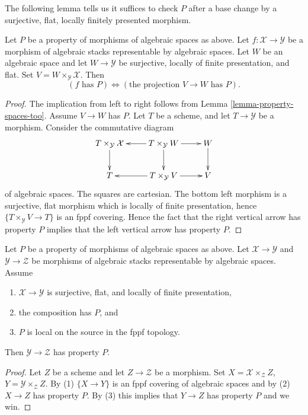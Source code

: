 \noindent
The following lemma tells us it suffices to check $P$
after a base change by a surjective, flat, locally finitely presented
morphism.

\begin{lemma}
\label{lemma-check-property-covering}
Let $P$ be a property of morphisms of algebraic spaces as above.
Let $f : \mathcal{X} \to \mathcal{Y}$ be a morphism of algebraic stacks
representable by algebraic spaces.
Let $W$ be an algebraic space and let $W \to \mathcal{Y}$ be surjective,
locally of finite presentation, and flat.
Set $V = W \times_{\mathcal{Y}} \mathcal{X}$. Then
$$
(f\text{ has }P) \Leftrightarrow (\text{the projection }V \to W\text{ has }P).
$$
\end{lemma}

\begin{proof}
The implication from left to right follows from
Lemma \ref{lemma-property-spaces-too}.
Assume $V \to W$ has $P$. Let $T$ be a scheme, and let
$T \to \mathcal{Y}$ be a morphism. Consider the commutative diagram
$$
\xymatrix{
T \times_{\mathcal{Y}} \mathcal{X} \ar[d] &
T \times_{\mathcal{Y}} W \ar[d] \ar[l] \ar[r] &
W \ar[d] \\
T & T \times_{\mathcal{Y}} V \ar[l] \ar[r] & V
}
$$
of algebraic spaces. The squares are cartesian.
The bottom left morphism is a surjective, flat morphism which is locally of
finite presentation, hence $\{T \times_{\mathcal{Y}} V \to T\}$ is an
fppf covering. Hence the fact that the right vertical arrow has property
$P$ implies that the left vertical arrow has property $P$.
\end{proof}

\begin{lemma}
\label{lemma-check-property-after-precomposing}
Let $P$ be a property of morphisms of algebraic spaces as above.
Let $\mathcal{X} \to \mathcal{Y}$ and $\mathcal{Y} \to \mathcal{Z}$
be morphisms of algebraic stacks representable by algebraic spaces.
Assume
\begin{enumerate}
\item $\mathcal{X} \to \mathcal{Y}$ is surjective, flat, and locally
of finite presentation,
\item the composition has $P$, and
\item $P$ is local on the source in the fppf topology.
\end{enumerate}
Then $\mathcal{Y} \to \mathcal{Z}$ has property $P$.
\end{lemma}

\begin{proof}
Let $Z$ be a scheme and let $Z \to \mathcal{Z}$ be a morphism.
Set $X = \mathcal{X} \times_\mathcal{Z} Z$,
$Y = \mathcal{Y} \times_\mathcal{Z} Z$. By (1) $\{X \to Y\}$
is an fppf covering of algebraic spaces and by (2) $X \to Z$ has property
$P$. By (3) this implies that $Y \to Z$ has property $P$
and we win.
\end{proof}

